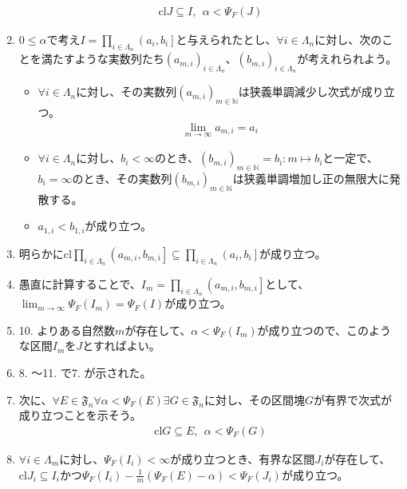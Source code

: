 \documentclass[dvipdfmx]{jsarticle}
\begin{document}
\begin{enumerate}
  \begin{align*}
  \mathrm{cl}J \subseteq I,\ \ \alpha < \varPsi_{F}(J)
  \end{align*}
\item
  $0 \leq \alpha$で考え$I = \prod_{i \in \varLambda_{n}} \left( a_{i},b_{i} \right]$と与えられたとし、$\forall i \in \varLambda_{n}$に対し、次のことを満たすような実数列たち$\left( a_{m,i} \right)_{i \in \varLambda_{n}}$、$\left( b_{m,i} \right)_{i \in \varLambda_{n}}$が考えれられよう。
  \begin{itemize}
  \item
    $\forall i \in \varLambda_{n}$に対し、その実数列$\left( a_{m,i} \right)_{m \in \mathbb{N}}$は狭義単調減少し次式が成り立つ。
  \begin{align*}
  \lim_{m \rightarrow \infty}a_{m,i} = a_{i}
  \end{align*}
  \item
    $\forall i \in \varLambda_{n}$に対し、$b_{i} < \infty$のとき、$\left( b_{m,i} \right)_{m \in \mathbb{N}} = b_{i}:m \mapsto b_{i}$と一定で、$b_{i} = \infty$のとき、その実数列$\left( b_{m,i} \right)_{m \in \mathbb{N}}$は狭義単調増加し正の無限大に発散する。
  \item
    $a_{1,i} < b_{1,i}$が成り立つ。
  \end{itemize}
\item
  明らかに$\mathrm{cl}{\prod_{i \in \varLambda_{n}} \left( a_{m,i},b_{m,i} \right]} \subseteq \prod_{i \in \varLambda_{n}} \left( a_{i},b_{i} \right]$が成り立つ。
\item
  愚直に計算することで、$I_{m} = \prod_{i \in \varLambda_{n}} \left( a_{m,i},b_{m,i} \right]$として、$\lim_{m \rightarrow \infty}{\varPsi_{F}\left( I_{m} \right)} = \varPsi_{F}(I)$が成り立つ。
\item
  10. よりある自然数$m$が存在して、$\alpha < \varPsi_{F}\left( I_{m} \right)$が成り立つので、このような区間$I_{m}$を$J$とすればよい。
\item
  8. ～11. で7. が示された。
\item
  次に、$\forall E \in \mathfrak{F}_{n}\forall\alpha < \varPsi_{F}(E)\exists G \in \mathfrak{F}_{n}$に対し、その区間塊$G$が有界で次式が成り立つことを示そう。
  \begin{align*}
  \mathrm{cl}G \subseteq E,\ \ \alpha < \varPsi_{F}(G)
  \end{align*}
\item
  $\forall i \in \varLambda_{m}$に対し、$\varPsi_{F}\left( I_{i} \right) < \infty$が成り立つとき、有界な区間$J_{i}$が存在して、$\mathrm{cl}J_{i} \subseteq I_{i}$かつ$\varPsi_{F}\left( I_{i} \right) - \frac{1}{m}\left( \varPsi_{F}(E) - \alpha \right) < \varPsi_{F}\left( J_{i} \right)$が成り立つ。

\end{enumerate}
\end{document}
